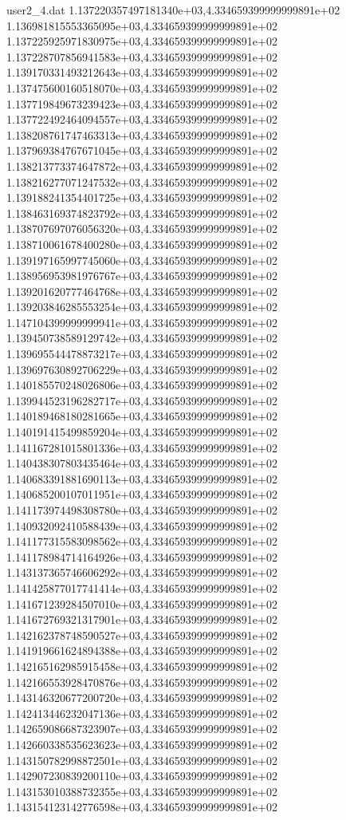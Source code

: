 \begin{filecontents}{user2_4.dat}
1.137220357497181340e+03,4.334659399999999891e+02
1.136981815553365095e+03,4.334659399999999891e+02
1.137225925971830975e+03,4.334659399999999891e+02
1.137228707856941583e+03,4.334659399999999891e+02
1.139170331493212643e+03,4.334659399999999891e+02
1.137475600160518070e+03,4.334659399999999891e+02
1.137719849673239423e+03,4.334659399999999891e+02
1.137722492464094557e+03,4.334659399999999891e+02
1.138208761747463313e+03,4.334659399999999891e+02
1.137969384767671045e+03,4.334659399999999891e+02
1.138213773374647872e+03,4.334659399999999891e+02
1.138216277071247532e+03,4.334659399999999891e+02
1.139188241354401725e+03,4.334659399999999891e+02
1.138463169374823792e+03,4.334659399999999891e+02
1.138707697076056320e+03,4.334659399999999891e+02
1.138710061678400280e+03,4.334659399999999891e+02
1.139197165997745060e+03,4.334659399999999891e+02
1.138956953981976767e+03,4.334659399999999891e+02
1.139201620777464768e+03,4.334659399999999891e+02
1.139203846285553254e+03,4.334659399999999891e+02
1.147104399999999941e+03,4.334659399999999891e+02
1.139450738589129742e+03,4.334659399999999891e+02
1.139695544478873217e+03,4.334659399999999891e+02
1.139697630892706229e+03,4.334659399999999891e+02
1.140185570248026806e+03,4.334659399999999891e+02
1.139944523196282717e+03,4.334659399999999891e+02
1.140189468180281665e+03,4.334659399999999891e+02
1.140191415499859204e+03,4.334659399999999891e+02
1.141167281015801336e+03,4.334659399999999891e+02
1.140438307803435464e+03,4.334659399999999891e+02
1.140683391881690113e+03,4.334659399999999891e+02
1.140685200107011951e+03,4.334659399999999891e+02
1.141173974498308780e+03,4.334659399999999891e+02
1.140932092410588439e+03,4.334659399999999891e+02
1.141177315583098562e+03,4.334659399999999891e+02
1.141178984714164926e+03,4.334659399999999891e+02
1.143137365746606292e+03,4.334659399999999891e+02
1.141425877017741414e+03,4.334659399999999891e+02
1.141671239284507010e+03,4.334659399999999891e+02
1.141672769321317901e+03,4.334659399999999891e+02
1.142162378748590527e+03,4.334659399999999891e+02
1.141919661624894388e+03,4.334659399999999891e+02
1.142165162985915458e+03,4.334659399999999891e+02
1.142166553928470876e+03,4.334659399999999891e+02
1.143146320677200720e+03,4.334659399999999891e+02
1.142413446232047136e+03,4.334659399999999891e+02
1.142659086687323907e+03,4.334659399999999891e+02
1.142660338535623623e+03,4.334659399999999891e+02
1.143150782998872501e+03,4.334659399999999891e+02
1.142907230839200110e+03,4.334659399999999891e+02
1.143153010388732355e+03,4.334659399999999891e+02
1.143154123142776598e+03,4.334659399999999891e+02

\end{filecontents}
